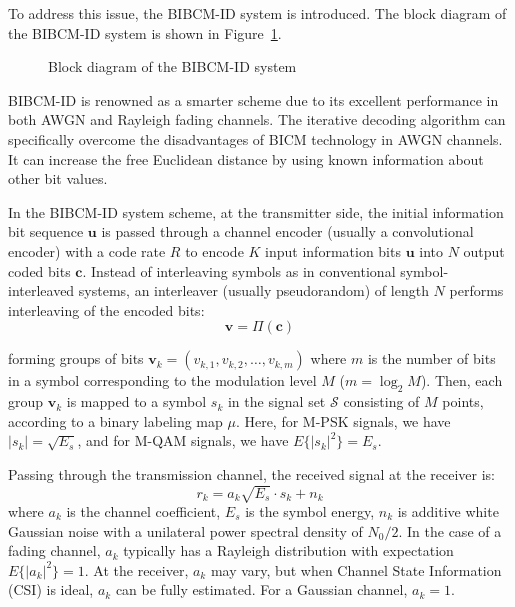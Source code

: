 \documentclass[a4paper,14pt]{extreport}
\begin{document}
To address this issue, the BIBCM-ID system is introduced. The block diagram of the BIBCM-ID system is shown in Figure~\ref{fig:bibcm_block}.

\begin{figure}[H]
    \centering
    \caption{Block diagram of the BIBCM-ID system}
    \label{fig:bibcm_block}
\end{figure}

BIBCM-ID is renowned as a smarter scheme due to its excellent performance in both AWGN and Rayleigh fading channels. The iterative decoding algorithm can specifically overcome the disadvantages of BICM technology in AWGN channels. It can increase the free Euclidean distance by using known information about other bit values.

In the BIBCM-ID system scheme, at the transmitter side, the initial information bit sequence $\mathbf{u}$ is passed through a channel encoder (usually a convolutional encoder) with a code rate $R$ to encode $K$ input information bits $\mathbf{u}$ into $N$ output coded bits $\mathbf{c}$. Instead of interleaving symbols as in conventional symbol-interleaved systems, an interleaver (usually pseudorandom) of length $N$ performs interleaving of the encoded bits:
\begin{equation}
    \mathbf{v} = \Pi(\mathbf{c})
    \label{eq:interleave}
\end{equation}

forming groups of bits $\mathbf{v}_k = (v_{k,1}, v_{k,2}, \ldots, v_{k,m})$ where $m$ is the number of bits in a symbol corresponding to the modulation level $M$ ($m = \log_2 M$). Then, each group $\mathbf{v}_k$ is mapped to a symbol $s_k$ in the signal set $\mathcal{S}$ consisting of $M$ points, according to a binary labeling map $\mu$. Here, for M-PSK signals, we have $|s_k| = \sqrt{E_s}$, and for M-QAM signals, we have $E\{|s_k|^2\} = E_s$.

Passing through the transmission channel, the received signal at the receiver is:
\begin{equation}
    r_k = a_k \sqrt{E_s} \cdot s_k + n_k
    \label{eq:channel}
\end{equation}
where $a_k$ is the channel coefficient, $E_s$ is the symbol energy, $n_k$ is additive white Gaussian noise with a unilateral power spectral density of $N_0/2$. In the case of a fading channel, $a_k$ typically has a Rayleigh distribution with expectation $E\{|a_k|^2\} = 1$. At the receiver, $a_k$ may vary, but when Channel State Information (CSI) is ideal, $a_k$ can be fully estimated. For a Gaussian channel, $a_k = 1$.
\end{document}
